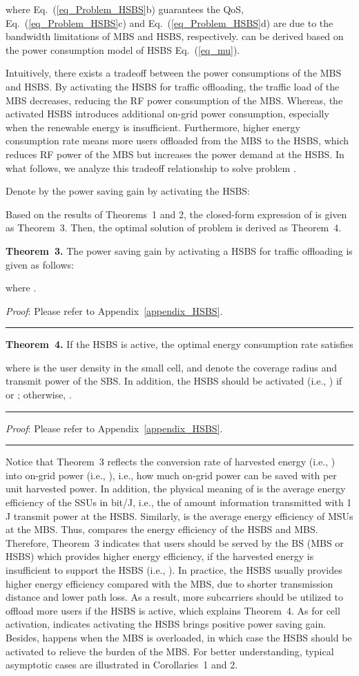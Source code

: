 \documentclass[12pt, draftclsnofoot,onecolumn]{IEEEtran}
\begin{document}
where Eq.~(\ref{eq_Problem_HSBS}b) guarantees the QoS, Eq.~(\ref{eq_Problem_HSBS}c) and  Eq.~(\ref{eq_Problem_HSBS}d) are due to the bandwidth limitations of MBS and HSBS, respectively.  can be derived based on the power consumption model of HSBS Eq.~(\ref{eq_mu}).

Intuitively, there exists a tradeoff between the power consumptions of the MBS and HSBS.
By activating the HSBS for traffic offloading, the traffic load of the MBS decreases, reducing the RF power consumption of the MBS.
Whereas, the activated HSBS introduces additional on-grid power consumption, especially when the renewable energy is insufficient.
Furthermore, higher energy consumption rate  means more users offloaded from the MBS to the HSBS, which reduces RF power of the MBS but increases the power demand at the HSBS.
In what follows, we analyze this tradeoff relationship to solve problem .

Denote by  the power saving gain by activating the HSBS:

Based on the results of Theorems~1 and 2, the closed-form expression of  is given as Theorem~3.
Then, the optimal solution of problem  is derived as Theorem~4.

\textbf{Theorem~3.} The power saving gain by activating a HSBS for traffic offloading is given as follows:

where .

\emph{Proof}: Please refer to Appendix~\ref{appendix_HSBS}. \hfill \rule{4pt}{8pt}

\textbf{Theorem~4.} If the HSBS is active, the optimal energy consumption rate satisfies

where  is the user density in the small cell,  and  denote the coverage radius and transmit power of the SBS.
In addition, the HSBS should be activated (i.e., ) if  or ; otherwise, .
\hfill \rule{4pt}{8pt}

\emph{Proof}: Please refer to Appendix~\ref{appendix_HSBS}. \hfill \rule{4pt}{8pt}

Notice that Theorem~3 reflects the conversion rate of harvested energy (i.e., ) into on-grid power (i.e., ), i.e., how much on-grid power can be saved with per unit harvested power.
In addition, the physical meaning of  is the average energy efficiency of the SSUs in bit/J, i.e., the of amount information transmitted with 1 J transmit power at the HSBS.
Similarly,  is the average energy efficiency of MSUs at the MBS.
Thus,  compares the energy efficiency of the HSBS and MBS.
Therefore, Theorem~3 indicates that users should be served by the BS (MBS or HSBS) which provides higher energy efficiency, if the harvested energy is insufficient to support the HSBS (i.e., ).
In practice, the HSBS usually provides higher energy efficiency compared with the MBS, due to shorter transmission distance and lower path loss.
As a result, more subcarriers should be utilized to offload more users if the HSBS is active, which explains Theorem~4.
As for cell activation,  indicates activating the HSBS brings positive power saving gain.
Besides,  happens when the MBS is overloaded, in which case the HSBS should be activated to relieve the burden of the MBS.
For better understanding, typical asymptotic cases are illustrated in Corollaries~1 and 2.
\end{document}
